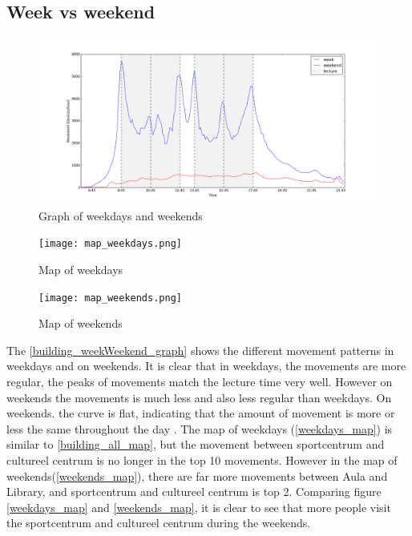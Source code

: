 \subsection{Week vs weekend}\label{chapter9weekweekend}
\begin{figure}[H]
	\centering
	\includegraphics[scale=0.3]{building_weekWeekend_graph.png}
	\captionsetup{justification=centering}
	\caption{Graph of weekdays and weekends}
	\label{building_weekWeekend_graph}
\end{figure}
\begin{figure}[H]
	\centering
	\texttt{[image: map\_weekdays.png]}
	\captionsetup{justification=centering}
	\caption{Map of weekdays}
	\label{weekdays_map}
\end{figure}

\begin{figure}[H]
	\centering
	\texttt{[image: map\_weekends.png]}
	\captionsetup{justification=centering}
	\caption{Map of weekends}
	\label{weekends_map}
\end{figure}
The \autoref{building_weekWeekend_graph} shows the different movement patterns in weekdays and on weekends. It is clear that in weekdays, the movements are more regular, the peaks of movements match the lecture time very well. However on weekends the movements is much less and also less regular than weekdays. On weekends. the curve is flat, indicating that the amount of movement is more or less the same throughout the day .
The map of weekdays (\autoref{weekdays_map}) is similar to \autoref{building_all_map}, but the movement between sportcentrum and cultureel centrum is no longer in the top 10 movements. However in the map of weekends(\autoref{weekends_map}), there are far more movements between Aula and Library, and sportcentrum and cultureel centrum is top 2. Comparing figure \autoref{weekdays_map} and \autoref{weekends_map}, it is clear to see that more people visit the sportcentrum and cultureel centrum during the weekends.
